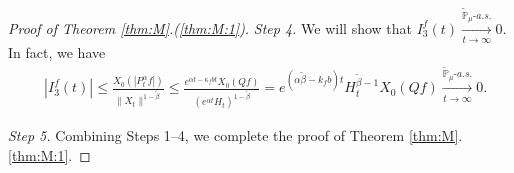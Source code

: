 \documentclass[12pt,a4paper]{amsart}
\theoremstyle{plain}
\theoremstyle{definition}
\numberwithin{equation}{section}
\begin{document}
\begin{proof}[Proof of Theorem \ref{thm:M}.(\ref{thm:M:1})]
	\emph{Step 4.} We will show that $I^f_3(t) \xrightarrow[t\to \infty]{\widetilde {\mathbb P}_\mu \text{-} a.s.} 0$.
  In fact, we have
  \begin{align}
    & |I^f_3(t)|
      \leq \frac{X_0(|P^\alpha_tf|)}{\|X_t\|^{1 - \tilde \beta }}
      \leq \frac{e^{\alpha t - \kappa_f b t}X_0(Qf)}{(e^{\alpha t} H_t)^{1 - \tilde \beta}}
      = e^{(\alpha \tilde \beta - k_fb)t} H_t^{\tilde \beta - 1} X_0(Qf)
      \xrightarrow[t\to \infty]{\widetilde {\mathbb P}_\mu \text{-} a.s.} 0.
  \end{align}

  \emph{Step 5.} Combining Steps 1--4, we complete the proof of Theorem  \ref{thm:M}.\eqref{thm:M:1}.
\end{proof}

\end{document}
